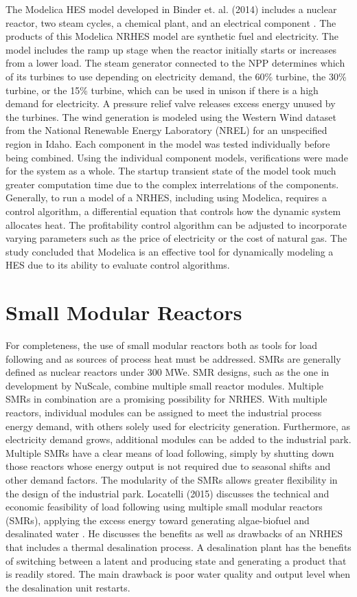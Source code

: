 \documentclass[12pt]{UIdahoMastersThesis}
\begin{document}
The Modelica HES model developed in Binder et. al. (2014) includes a nuclear reactor, two steam cycles, a chemical plant, and an electrical component \cite{Binder2014}. The products of this Modelica NRHES model are synthetic fuel and electricity. The model includes the ramp up stage when the reactor initially starts or increases from a lower load. The steam generator connected to the NPP determines which of its turbines to use depending on electricity demand, the 60\% turbine, the 30\% turbine, or the 15\% turbine, which can be used in unison if there is a high demand for electricity. A pressure relief valve releases excess energy unused by the turbines. The wind generation is modeled using the Western Wind dataset from the National Renewable Energy Laboratory (NREL) for an unspecified region in Idaho. Each component in the model was tested individually before being combined. Using the individual component models, verifications were made for the system as a whole. The startup transient state of the model took much greater computation time due to the complex interrelations of the components. Generally, to run a model of a NRHES, including using Modelica, requires a control algorithm, a differential equation that controls how the dynamic system allocates heat. The profitability control algorithm can be adjusted to incorporate varying parameters such as the price of electricity or the cost of natural gas. The study concluded that Modelica is an effective tool for dynamically modeling a HES due to its ability to evaluate control algorithms.

\section{Small Modular Reactors}
For completeness, the use of small modular reactors both as tools for load following and as sources of process heat must be addressed. SMRs are generally defined as nuclear reactors under 300 MWe. SMR designs, such as the one in development by NuScale, combine multiple small reactor modules. Multiple SMRs in combination are a promising possibility for NRHES.  With multiple reactors, individual modules can be assigned to meet the industrial process energy demand, with others solely used for electricity generation. Furthermore, as electricity demand grows, additional modules can be added to the industrial park. Multiple SMRs have a clear means of load following, simply by shutting down those reactors whose energy output is not required due to seasonal shifts and other demand factors. The modularity of the SMRs allows greater flexibility in the design of the industrial park.  Locatelli (2015) discusses the technical and economic feasibility of load following using multiple small modular reactors (SMRs), applying the excess energy toward generating algae-biofuel and desalinated water \cite{Locatelli2015}. He discusses the benefits as well as drawbacks of an NRHES that includes a thermal desalination process. A desalination plant has the benefits of switching between a latent and producing state and generating a product that is readily stored. The main drawback is poor water quality and output level when the desalination unit restarts.
\end{document}
